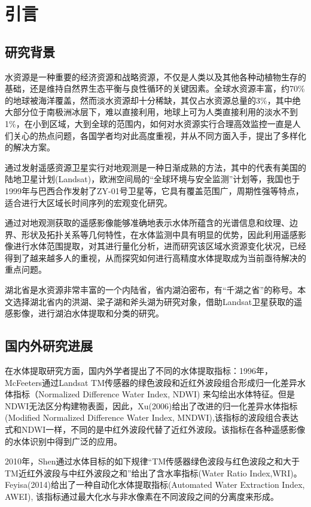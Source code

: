 \documentclass[supercite]{upcthesis}
\begin{document}
\tableofcontents

\section{引言}
\subsection{研究背景}
水资源是一种重要的经济资源和战略资源，不仅是人类以及其他各种动植物生存的基础，还是维持自然界生态平衡与良性循环的关键因素。全球水资源丰富，约70\%的地球被海洋覆盖，然而淡水资源却十分稀缺，其仅占水资源总量的3\%，其中绝大部分位于南极洲冰层下，难以直接利用，地球上可为人类直接利用的淡水不到1\%，在小到区域，大到全球的范围内，如何对水资源实行合理高效监控一直是人们关心的热点问题，各国学者均对此高度重视，并从不同方面入手，提出了多样化的解决方案。

通过发射遥感资源卫星实行对地观测是一种日渐成熟的方法，其中的代表有美国的陆地卫星计划(Landsat)，欧洲空间局的“全球环境与安全监测”计划等，我国也于1999年与巴西合作发射了ZY-01号卫星等，它具有覆盖范围广，周期性强等特点，适合进行大区域长时间序列的宏观变化研究。

通过对地观测获取的遥感影像能够准确地表示水体所蕴含的光谱信息和纹理、边界、形状及拓扑关系等几何特性，在水体监测中具有明显的优势，因此利用遥感影像进行水体范围提取，对其进行量化分析，进而研究该区域水资源变化状况，已经得到了越来越多人的重视，从而探究如何进行高精度水体提取成为当前亟待解决的重点问题。

湖北省是水资源非常丰富的一个内陆省，省内湖泊密布，有“千湖之省”的称号。本文选择湖北省内的洪湖、梁子湖和斧头湖为研究对象，借助Landsat卫星获取的遥感影像，进行湖泊水体提取和分类的研究。
\subsection{国内外研究进展}
在水体提取研究方面，国内外学者提出了不同的水体提取指标：1996年，McFeeters通过Landsat TM传感器的绿色波段和近红外波段组合形成归一化差异水体指标（Normalized Difference Water Index, NDWI) 来勾绘出水体特征\cite{Mcfeeters1996The}。但是NDWI无法区分构建物表面，因此，Xu(2006)给出了改进的归一化差异水体指标(Modified Normalized Difference Water Index, MNDWI)\cite{Hanqiu2006Modification},该指标的波段组合表达式和NDWI一样，不同的是中红外波段代替了近红外波段。该指标在各种遥感影像的水体识别中得到广泛的应用。

2010年，Shen通过水体目标的如下规律“TM传感器绿色波段与红色波段之和大于TM近红外波段与中红外波段之和”给出了含水率指标(Water Ratio Index,WRI)\cite{Shen2010Water}。
Feyisa(2014)给出了一种自动化水体提取指标(Automated Water Extraction Index, AWEI)\cite{Feyisa2014Automated}, 该指标通过最大化水与非水像素在不同波段之间的分离度来形成。
\end{document}
